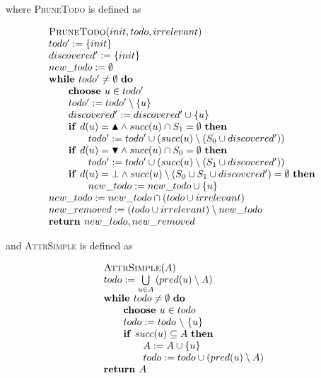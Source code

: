 \documentclass{article}
\newcommand{\Space}{\text{\ }}
\newcommand{\If}{\text{\textbf{if }}}
\newcommand{\Do}{\text{\textbf{do }}}
\newcommand{\Then}{\text{\textbf{then }}}
\newcommand{\While}{\text{\textbf{while }}}
\newcommand{\Choose}{\text{\textbf{choose }}}
\newcommand{\Return}{\text{\textbf{return }}}
\begin{document}
where \textsc{PruneTodo} is defined as

\begin{equation*}
\begin{array}{l}
\textsc{PruneTodo}(init, todo, irrelevant) \\ 
todo' := \{init\} \\
discovered' := \{init\} \\
new\_todo := \emptyset \\
\While todo' \neq \emptyset \Space \Do \\
\qquad \Choose u \in todo' \\
\qquad todo' := todo' \setminus \{ u \} \\
\qquad discovered' := discovered' \cup \{ u \} \\
\qquad \If d(u) = \blacktriangle \wedge succ(u) \cap S_1 = \emptyset \Space \Then \\
\qquad \qquad todo' := todo' \cup (succ(u) \setminus (S_0 \cup discovered')) \\
\qquad \If d(u) = \blacktriangledown \wedge succ(u) \cap S_0 = \emptyset \Space \Then \\
\qquad \qquad todo' := todo' \cup (succ(u) \setminus (S_1 \cup discovered')) \\
\qquad \If d(u) = \bot \wedge succ(u) \setminus (S_0 \cup S_1 \cup discovered') = \emptyset \Space \Then \\
\qquad \qquad new\_todo := new\_todo \cup \{ u \} \\
new\_todo := new\_todo \cap (todo \cup irrelevant) \\
new\_removed := (todo \cup irrelevant) \setminus new\_todo \\
\Return new\_todo, new\_removed
\end{array}
\end{equation*}

and \textsc{AttrSimple} is defined as

\begin{equation*}
\begin{array}{l}
\textsc{AttrSimple}(A) \\ 
todo:=\bigcup\limits_{u\in A}\left( pred(u)\setminus A\right)  \\ 
\While todo \neq \emptyset \Space \Do \\ 
\qquad \Choose u \in todo \\ 
\qquad todo:=todo\ \backslash \ \{u\} \\ 
\qquad \If succ(u)\subseteq A \Space \Then \\ 
\qquad \qquad A:=A\cup \{u\} \\ 
\qquad \qquad todo:=todo\cup \left( pred(u)\setminus A\right)  \\ 
\Return A
\end{array}
\end{equation*}
\end{document}
